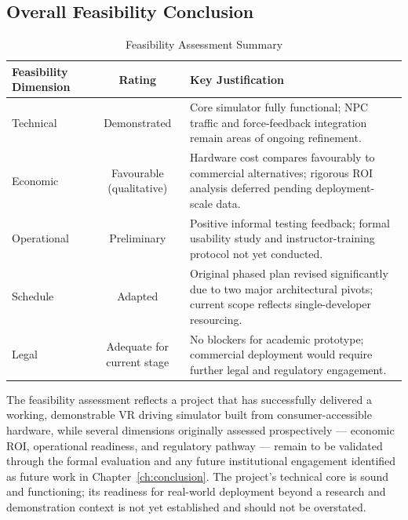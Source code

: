 \subsection{Overall Feasibility Conclusion}

\begin{table}[h]
\caption{Feasibility Assessment Summary}
\label{tab:feasibility}
\centering
\begin{tabular}{|l|c|p{6.5cm}|}
\hline
\textbf{Feasibility Dimension} & \textbf{Rating} & \textbf{Key Justification} \\ \hline
Technical & Demonstrated & Core simulator fully functional; NPC traffic and force-feedback integration remain areas of ongoing refinement. \\ \hline
Economic & Favourable (qualitative) & Hardware cost compares favourably to commercial alternatives; rigorous ROI analysis deferred pending deployment-scale data. \\ \hline
Operational & Preliminary & Positive informal testing feedback; formal usability study and instructor-training protocol not yet conducted. \\ \hline
Schedule & Adapted & Original phased plan revised significantly due to two major architectural pivots; current scope reflects single-developer resourcing. \\ \hline
Legal & Adequate for current stage & No blockers for academic prototype; commercial deployment would require further legal and regulatory engagement. \\ \hline
\end{tabular}
\end{table}

The feasibility assessment reflects a project that has successfully delivered a working, demonstrable VR driving simulator built from consumer-accessible hardware, while several dimensions originally assessed prospectively — economic ROI, operational readiness, and regulatory pathway — remain to be validated through the formal evaluation and any future institutional engagement identified as future work in Chapter~\ref{ch:conclusion}. The project's technical core is sound and functioning; its readiness for real-world deployment beyond a research and demonstration context is not yet established and should not be overstated.